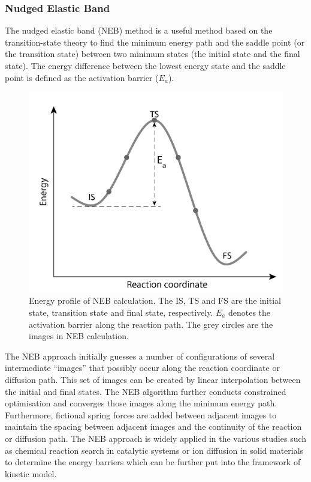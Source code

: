 \documentclass[../main.tex]{subfiles}
\begin{document}
\subsubsection{Nudged Elastic Band} 
\label{sec:methods_neb}

The nudged elastic band (NEB) method is a useful method based on the transition-state theory to find the minimum energy path and the saddle point (or the transition state) between two minimum states (the initial state and the final state).\cite{henkelman2000climbing,henkelman2000improved} The energy difference between the lowest energy state and the saddle point is defined as the activation barrier ($E_a$). 

\begin{figure}
    \centering
    \includegraphics[scale=0.6]{figures/NEB_profile.png}
    \caption{Energy profile of NEB calculation. The IS, TS and FS are the initial state, transition state and final state, respectively. $E_a$ denotes the activation barrier along the reaction path. The grey circles are the images in NEB calculation.}
    \label{fig:NEB_profile}
\end{figure}

The NEB approach initially guesses a number of configurations of several intermediate ``images'' that possibly occur along the reaction coordinate or diffusion path. This set of images can be created by linear interpolation between the initial and final states. The NEB algorithm further conducts constrained optimisation and converges those images along the minimum energy path. Furthermore, fictional spring forces are added between adjacent images to maintain the spacing between adjacent images and the continuity of the reaction or diffusion path. The NEB approach is widely applied in the various studies such as chemical reaction search in catalytic systems or ion diffusion in solid materials to determine the energy barriers which can be further put into the framework of kinetic model.\cite{peng2020lithium,Mercer2021}
\end{document}
